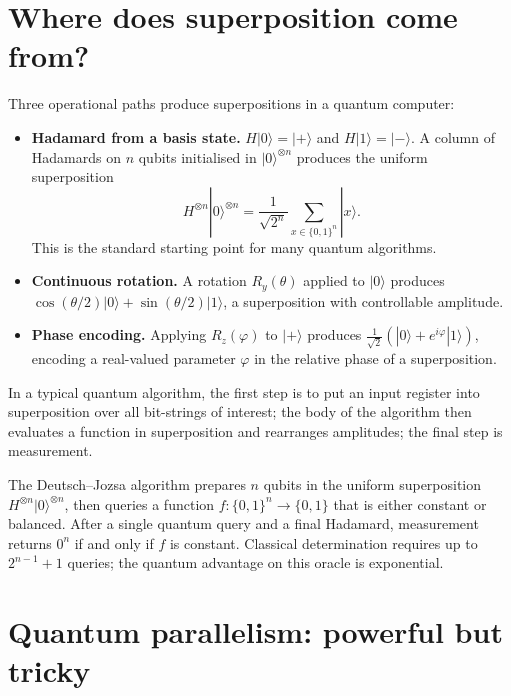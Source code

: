 \section{Where does superposition come from?}

Three operational paths produce superpositions in a quantum computer:

\begin{itemize}
  \item \textbf{Hadamard from a basis state.} $H|0\rangle = |+\rangle$ and $H|1\rangle = |-\rangle$. A column of Hadamards on $n$ qubits initialised in $|0\rangle^{\otimes n}$ produces the uniform superposition
  \[
    H^{\otimes n}|0\rangle^{\otimes n} = \frac{1}{\sqrt{2^n}}\sum_{x\in\{0,1\}^n} |x\rangle.
  \]
  This is the standard  starting point for many quantum algorithms.
  \item \textbf{Continuous rotation.} A rotation $R_y(\theta)$ applied to $|0\rangle$ produces $\cos(\theta/2)|0\rangle + \sin(\theta/2)|1\rangle$, a superposition with controllable amplitude.
  \item \textbf{Phase encoding.} Applying $R_z(\varphi)$ to $|+\rangle$ produces $\tfrac{1}{\sqrt 2}(|0\rangle + e^{i\varphi}|1\rangle)$, encoding a real-valued parameter $\varphi$ in the relative phase of a superposition.
\end{itemize}

In a typical quantum algorithm, the first step is to put an input register into superposition over all bit-strings of interest; the body of the algorithm then evaluates a function in superposition and rearranges amplitudes; the final step is measurement.

\begin{example}
The Deutsch--Jozsa algorithm \citep{deutsch_quantum_1985} prepares $n$ qubits in the uniform superposition $H^{\otimes n}|0\rangle^{\otimes n}$, then queries a function $f:\{0,1\}^n \to \{0,1\}$ that is either constant or balanced. After a single quantum query and a final Hadamard, measurement returns $0^n$ if and only if $f$ is constant. Classical determination requires up to $2^{n-1}+1$ queries; the quantum advantage on this oracle is exponential.
\end{example}

\section{Quantum parallelism: powerful but tricky}

